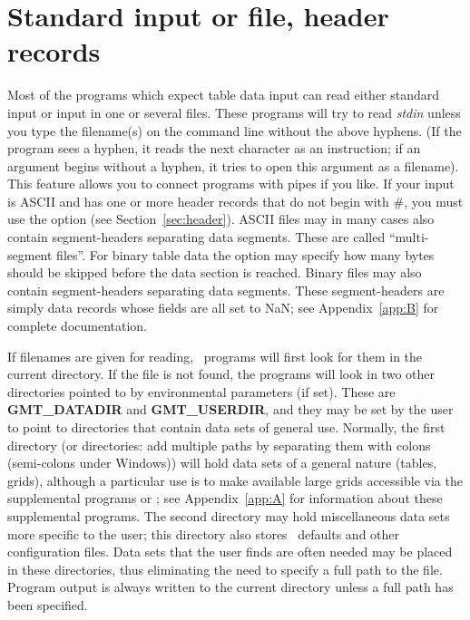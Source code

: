 \section{Standard input or file, header records}

Most of the programs which expect table data input can read
either standard input or input in one or several files.
These programs will try to read \emph{stdin} unless you type
the filename(s) on the command line without the above hyphens.
(If the program sees a hyphen, it reads the next character
as an instruction; if an argument begins without a hyphen,
it tries to open this argument as a filename).
This feature allows you to connect programs with pipes if
you like.  If your input is ASCII and has one or more header
records that do not begin with \#, you must use the 
option (see Section~\ref{sec:header}).
ASCII files may in many cases also contain segment-headers
separating data segments.  These are called ``multi-segment files''.
For binary table data the  option may specify how many bytes should
be skipped before the data section is reached.
Binary files may also contain segment-headers
separating data segments.  These segment-headers are simply data records
whose fields are all set to NaN;
see Appendix~\ref{app:B} for complete documentation. 

If filenames are given for reading, \GMT\ programs will first look for them in the
current directory.  If the file is not found, the programs
will look in two other directories pointed to by environmental
parameters (if set).  These are \textbf{GMT\_DATADIR} and
\textbf{GMT\_USERDIR}, and they may be set by the user to point to directories
that contain data sets of general use.  Normally, the first directory (or directories:
add multiple paths by separating them with colons (semi-colons under Windows)) will
hold data sets of a general nature (tables, grids), although a particular use
is to make available large grids accessible via the supplemental programs 
or ; see Appendix~\ref{app:A} for information
about these supplemental programs.  The second directory may hold miscellaneous
data sets more specific to the user; this directory also stores \GMT\ defaults and other
configuration files.  Data sets that the user finds are often needed
may be placed in these directories, thus eliminating the need to specify
a full path to the file.  Program output is always written to the
current directory unless a full path has been specified.

